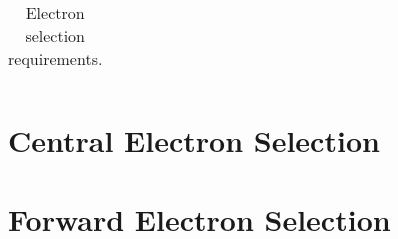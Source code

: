 \begin{table}[!htbp]
\begin{tabular}{ l  l l }
    \hline \hline
  \end{tabular}
   \caption{Electron selection requirements.}
   \label{table:objsel-el}
\end{table}

\section{Central Electron Selection}

\section{Forward Electron Selection}

